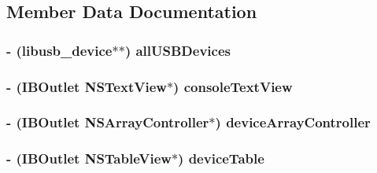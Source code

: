 \subsection{Member Data Documentation}
\hypertarget{interface_c_t_app_delegate_a9d80eb0a8fb6f9c373648cba3dbe5b26}{
\subsubsection[{all\-U\-S\-B\-Devices}]{\setlength{\rightskip}{0pt plus 5cm}-\/ (libusb\-\_\-device$\ast$$\ast$) all\-U\-S\-B\-Devices\hspace{0.3cm}{\ttfamily [protected]}}}\label{interface_c_t_app_delegate_a9d80eb0a8fb6f9c373648cba3dbe5b26}
\hypertarget{interface_c_t_app_delegate_a02680c24bf116eb7869cfe0489b2a381}{
\subsubsection[{console\-Text\-View}]{\setlength{\rightskip}{0pt plus 5cm}-\/ (I\-B\-Outlet N\-S\-Text\-View$\ast$) console\-Text\-View\hspace{0.3cm}{\ttfamily [protected]}}}\label{interface_c_t_app_delegate_a02680c24bf116eb7869cfe0489b2a381}
\hypertarget{interface_c_t_app_delegate_a39b7c3b8cf871476b88dbd4bcd75c375}{
\subsubsection[{device\-Array\-Controller}]{\setlength{\rightskip}{0pt plus 5cm}-\/ (I\-B\-Outlet N\-S\-Array\-Controller$\ast$) device\-Array\-Controller\hspace{0.3cm}{\ttfamily [protected]}}}\label{interface_c_t_app_delegate_a39b7c3b8cf871476b88dbd4bcd75c375}
\hypertarget{interface_c_t_app_delegate_aa9da52eef008be58cd46240bd866fc4e}{
\subsubsection[{device\-Table}]{\setlength{\rightskip}{0pt plus 5cm}-\/ (I\-B\-Outlet N\-S\-Table\-View$\ast$) device\-Table\hspace{0.3cm}{\ttfamily [protected]}}}\label{interface_c_t_app_delegate_aa9da52eef008be58cd46240bd866fc4e}
